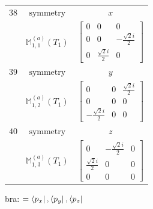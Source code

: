 \documentclass[fleqn,8pt,landscape]{jsarticle}
\begin{document}
\begin{longtable}{ccc}
$ 38 $ & $ \text{symmetry} $ & $ x $ \\
$  $ & $ \mathbb{M}_{1,1}^{(a)}(T_{1}) $ & $ \begin{bmatrix} 0 & 0 & 0 \\ 0 & 0 & - \frac{\sqrt{2} i}{2} \\ 0 & \frac{\sqrt{2} i}{2} & 0 \end{bmatrix} $ \\ \hline
$ 39 $ & $ \text{symmetry} $ & $ y $ \\
$  $ & $ \mathbb{M}_{1,2}^{(a)}(T_{1}) $ & $ \begin{bmatrix} 0 & 0 & \frac{\sqrt{2} i}{2} \\ 0 & 0 & 0 \\ - \frac{\sqrt{2} i}{2} & 0 & 0 \end{bmatrix} $ \\ \hline
$ 40 $ & $ \text{symmetry} $ & $ z $ \\
$  $ & $ \mathbb{M}_{1,3}^{(a)}(T_{1}) $ & $ \begin{bmatrix} 0 & - \frac{\sqrt{2} i}{2} & 0 \\ \frac{\sqrt{2} i}{2} & 0 & 0 \\ 0 & 0 & 0 \end{bmatrix} $ \\ \hline
\end{longtable}
bra: $=\bra{p_{x}}, \bra{p_{y}}, \bra{p_{z}}$
\end{document}
